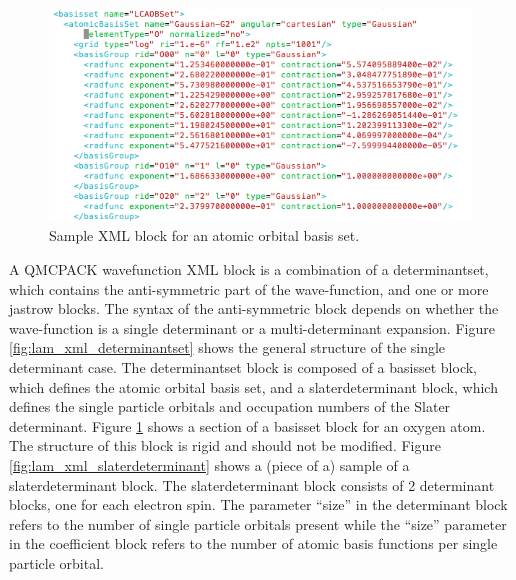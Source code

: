 \begin{figure}[ht!]
\begin{center}
\includegraphics[trim = 0mm 0mm 0mm 0mm, clip,width=1.0\columnwidth]{./figures/lab_advanced_molecules_xml_basisset}
\end{center}
\caption{Sample XML block for an atomic orbital basis set.
\label{fig:lam_xml_basisset}
}
\end{figure}

A QMCPACK wavefunction XML block is a combination of a determinantset, which
contains the anti-symmetric part of the wave-function, and one or more jastrow blocks.
The syntax of the anti-symmetric block depends on whether the wave-function is a single
determinant or a multi-determinant expansion. Figure \ref{fig:lam_xml_determinantset} 
shows the general structure of the
single determinant case. The determinantset block is composed of a basisset block, which
defines the atomic orbital basis set, and a slaterdeterminant block, which defines the single
particle orbitals and occupation numbers of the Slater determinant. Figure \ref{fig:lam_xml_basisset} 
shows a section
of a basisset block for an oxygen atom. The structure of this block is rigid and should not
be modified. Figure \ref{fig:lam_xml_slaterdeterminant} shows a (piece of a) sample of a 
slaterdeterminant block. The
slaterdeterminant block consists of 2 determinant blocks, one for each electron spin. The
parameter “size” in the determinant block refers to the number of single particle orbitals
present while the “size” parameter in the coefficient block refers to the number of atomic
basis functions per single particle orbital.

